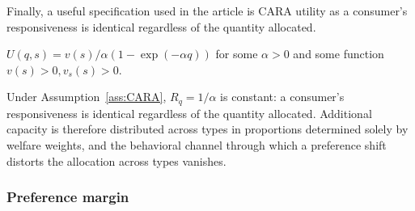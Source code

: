 \documentclass{class}
\begin{document}
Finally, a useful specification used in the article is CARA utility as a consumer's responsiveness is identical regardless of the quantity allocated. 
 
\renewcommand{\theassumption}{CARA}
\begin{assumption}\label{ass:CARA}
$U(q,s) = v(s)/\alpha(1-\exp(-\alpha q))$ for some $\alpha > 0$ and some function $v(s) > 0,v_s(s) > 0$.
\end{assumption}
\renewcommand{\theassumption}{\arabic{assumption}}

Under Assumption~\ref{ass:CARA}, $R_q = 1/\alpha$ is constant: a consumer's responsiveness is identical regardless of the quantity allocated. Additional capacity is therefore distributed across types in proportions determined solely by welfare weights, and the behavioral channel through which a preference shift distorts the allocation across types vanishes.

\subsubsection{Preference margin}
\end{document}
